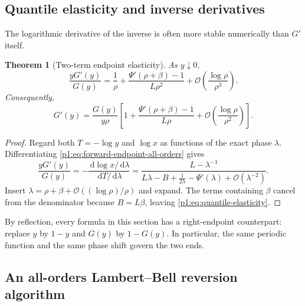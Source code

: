 \documentclass[11pt,oneside]{article}
\numberwithin{equation}{section}
\newtheorem{theorem}{Theorem}[section]
\theoremstyle{definition}
\theoremstyle{remark}
\newcommand{\dd}{\,\mathrm d}
\newcommand{\bigO}{\mathcal O}
\begin{document}
\subsection{Quantile elasticity and inverse derivatives}

The logarithmic derivative of the inverse is often more stable numerically than $G'$ itself.

\begin{theorem}[Two-term endpoint elasticity]
\label{p1:thm:quantile-elasticity}
As $y\downarrow0$,
\begin{equation}
 \boxed{
 \frac{yG'(y)}{G(y)}
 =\frac1\rho+\frac{\Psi'(\rho+\beta)-1}{L\rho^2}
 +\bigO\!\left(\frac{\log\rho}{\rho^3}\right).}
 \label{p1:eq:quantile-elasticity}
\end{equation}
Consequently,
\begin{equation}
 G'(y)=\frac{G(y)}{y\rho}
 \left[1+\frac{\Psi'(\rho+\beta)-1}{L\rho}
 +\bigO\!\left(\frac{\log\rho}{\rho^2}\right)\right].
 \label{p1:eq:Gprime-endpoint}
\end{equation}
\end{theorem}

\begin{proof}
Regard both $T=-\log y$ and $\log x$ as functions of the exact phase $\lambda$.
Differentiating \eqref{p1:eq:forward-endpoint-all-orders} gives
\begin{equation}
 \frac{yG'(y)}{G(y)}
 =-\frac{\dd\log x/\dd\lambda}{\dd T/\dd\lambda}
 =\frac{L-\lambda^{-1}}
 {L\lambda-B+\tfrac1{2\lambda}-\Psi'(\lambda)+\bigO(\lambda^{-2})}.
 \label{p1:eq:elasticity-exact-ratio}
\end{equation}
Insert $\lambda=\rho+\beta+\bigO((\log\rho)/\rho)$ and expand.  The terms
containing $\beta$ cancel from the denominator because $B=L\beta$, leaving
\eqref{p1:eq:quantile-elasticity}.
\end{proof}

By reflection, every formula in this section has a right-endpoint counterpart: replace
$y$ by $1-y$ and $G(y)$ by $1-G(y)$.  In particular, the same periodic function and
the same phase shift govern the two ends.

\subsection{An all-orders Lambert--Bell reversion algorithm}
\end{document}
